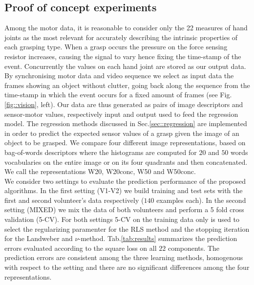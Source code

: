 \subsection{Proof of concept experiments}
Among the motor data, it is reasonable to consider only the 22 measures of hand joints as the most relevant for accurately describing the intrinsic properties of each grasping type.
When a grasp occurs the pressure on the force sensing resistor increases, causing the signal to vary hence fixing the time-stamp 
of the event. Concurrently the values on each hand joint are stored as our output data.
%
By synchronising motor data and video sequence we select as input data the frames showing an object without clutter, going back along the sequence from the time-stamp in which the event occurs for a fixed amount of frames (see Fig. \ref{fig::vision}, left). 
Our data are thus generated as pairs of image descriptors and sensor-motor values, respectively input and output used to feed the regression model. %
The regression methods discussed in Sec.\ref{sec::regression} are implemented in order to predict the expected sensor values of a grasp given the image of an object to be grasped. 
We compare four different image representations, based on bag-of-words descriptors where the histograms are computed for $20$ and $50$ words vocabularies on the entire image or on its four quadrants and then concatenated. We call the representations W20, W20conc, W50 and W50conc.\\
We consider two settings to evaluate the prediction performance of the proposed algorithms. In the first setting (V1-V2) we build training and test sets with the first and second volunteer's data respectively ($140$ examples each). In the second setting (MIXED) we mix the data of both volunteers and perform a 5 fold cross validation (5-CV). For both settings 5-CV on the training data only is used to select the regularizing paramenter for the RLS method and the stopping iteration for the Landweber and $\nu$-method. Tab.\ref{tab:results} summarizes the prediction errors evaluated according to the square loss on all $22$ components.
The prediction errors are consistent among the three learning methods, homogenous with respect to the setting and there are no significant differences among the four representations.
